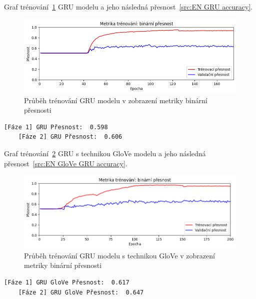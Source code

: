 Graf trénování~\ref{fig:EN GRU model train} GRU modelu a jeho následná přesnost~\ref{src:EN GRU accuracy}.
\begin{figure}[H]
	\centering
	\includegraphics[width=1\textwidth]{Figures/EN_GRU_binarni_presnost.png}
	\caption{Průběh trénování GRU modelu v zobrazení metriky binární přesnosti}\label{fig:EN GRU model train}
\end{figure}
\begin{lstlisting}[label=src:EN GRU accuracy, caption={Výsledek GRU modelu na anglickém datasetu po trénování~\ref{fig:EN GRU model train}}]
	[Fáze 1] GRU Přesnost:  0.598
	[Fáze 2] GRU Přesnost:  0.606
\end{lstlisting}

Graf trénování~\ref{fig:EN GloVe GRU model train} GRU s technikou GloVe modelu a jeho následná přesnost~\ref{src:EN GloVe GRU accuracy}.
\begin{figure}[H]
	\centering
	\includegraphics[width=1\textwidth]{Figures/EN_GRU_GLOVE_binarni_presnost.png}
	\caption{Průběh trénování GRU modelu s technikou GloVe v zobrazení metriky binární přesnosti}\label{fig:EN GloVe GRU model train}
\end{figure}
\begin{lstlisting}[label=src:EN GloVe GRU accuracy, caption={Výsledek GRU modelu s technikou GloVe na anglickém datasetu po trénování~\ref{fig:EN GloVe GRU model train}}]
	[Fáze 1] GRU GloVe Přesnost:  0.617
	[Fáze 2] GRU GloVe Přesnost:  0.647
\end{lstlisting}

